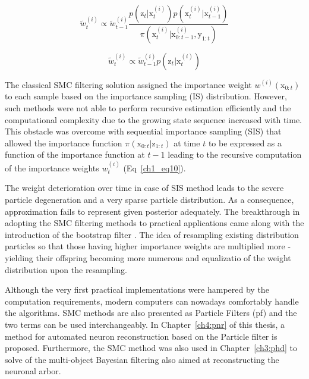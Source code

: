 \begin{equation}
\tilde{w}_{t}^{(i)} \propto \tilde{w}_{t-1}^{(i)} \frac{p(\mathrm{z}_t | \mathrm{x}_{t}^{(i)}) p(\mathrm{x}_{t}^{(i)} | \mathrm{x}_{t-1}^{(i)} )}{ \pi(\mathrm{x}_{t}^{(i)} | \mathrm{x}_{0:t-1}^{(i)}, \mathrm{y}_{1:t}) }
\label{ch1_eq10}
\end{equation}

\begin{equation}
\tilde{w}_{t}^{(i)} \propto \tilde{w}_{t-1}^{(i)} p(\mathrm{z}_t | \mathrm{x}_{t}^{(i)})
\label{ch1_eq11}
\end{equation}

The classical SMC filtering solution assigned the importance weight $w^{(i)}(\mathrm{x}_{0:t})$ to each sample based on the importance sampling (IS) distribution. However, such methods were not able to perform recursive estimation efficiently and the computational complexity due to the growing state sequence increased with time. This obstacle was overcome with sequential importance sampling (SIS) that allowed the importance function $\pi(\mathrm{x}_{0:t} | \mathrm{z}_{1:t})$ at time $t$ to be expressed as a function of the importance function at $t-1$ leading to the recursive computation of the importance weights $w_{t}^{(i)}$ (Eq~\ref{ch1_eq10}).

The weight deterioration over time in case of SIS method leads to the severe particle degeneration and a very sparse particle distribution. As a consequence, approximation fails to represent given posterior adequately. The breakthrough in adopting the SMC filtering methods to practical applications came along with the introduction of the bootstrap filter \cite{gordon1993novel}. The idea of resampling existing distribution particles so that those having higher importance weights are multiplied more - yielding their offspring becoming more numerous and equalizatio of the weight distribution upon the resampling.

Although the very first practical implementations were hampered by the computation requirements, modern computers can nowadays comfortably handle the algorithms. SMC methods are also presented as Particle Filters (\gls{pf}) and the two terms can be used interchangeably. In Chapter~\ref{ch4:pnr} of this thesis, a method for automated neuron reconstruction based on the Particle filter is proposed. Furthermore, the SMC method was also used in Chapter~\ref{ch3:phd} to solve of the multi-object Bayesian filtering also aimed at reconstructing the neuronal arbor. 

